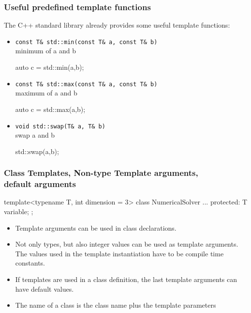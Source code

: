 \documentclass[aspectratio=169,ignorenonframetext,11pt]{beamer}
\def\inline{\lstinline[basicstyle=\small\ttfamily]}
\begin{document}

\begin{frame}[fragile]
\frametitle{Useful predefined template functions}
The C++ standard library already provides some useful template functions:
\begin{itemize}%
\item \inline!const T& std::min(const T& a, const T& b)! \\
  minimum of a and b\\
  \begin{cppcode}
    auto c = std::min(a,b);
  \end{cppcode}
\item \inline!const T& std::max(const T& a, const T& b)! \\
  maximum of a and b\\
  \begin{cppcode}
    auto c = std::max(a,b);
  \end{cppcode}
\item \inline!void std::swap(T& a, T& b)! \\
  swap a and b\\
  \begin{cppcode}
    std::swap(a,b);
  \end{cppcode}
\end{itemize}
\end{frame}



\begin{frame}[fragile]
\frametitle{Class Templates, Non-type Template arguments, \\ default arguments}
\begin{cppcode}
template<typename T, int dimension = 3>
class NumericalSolver
{
    ...
  protected:
    T variable;
};
\end{cppcode}
\begin{itemize}%
\item Template arguments can be used in class declarations.
\item Not only types, but also integer values can be used as template arguments. The values used in the template instantiation have to be compile time constants.
\item If templates are used in a class definition, the last template arguments can have default values.
\item The name of a class is the class name plus the template parameters
\end{itemize}

\end{frame}
\end{document}
